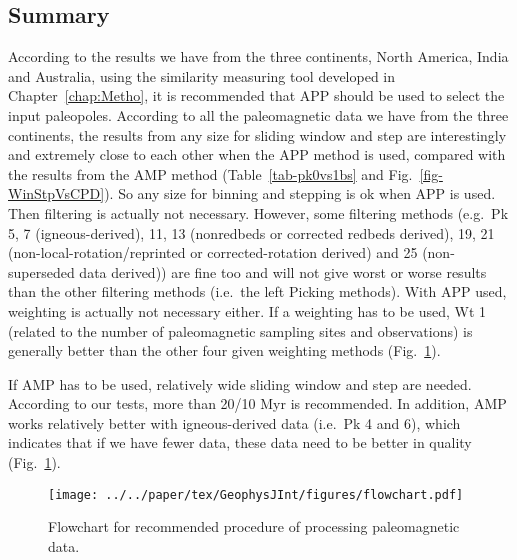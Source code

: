 \subsection{Summary}

According to the results we have from the three continents, North America, India
and Australia, using the similarity measuring tool developed in
Chapter~\ref{chap:Metho}, it is recommended that APP should be used to select
the input paleopoles. According to all the paleomagnetic data we have from the
three continents, the results from any size for sliding window and step are
interestingly and extremely close to each other when the APP method is used,
compared with the results from the AMP method (Table~\ref{tab-pk0vs1bs} and
Fig.~\ref{fig-WinStpVsCPD}). So any size for binning and stepping is ok when APP
is used. Then filtering is actually not necessary. However, some filtering
methods (e.g.\ Pk 5, 7 (igneous-derived), 11, 13 (nonredbeds or corrected
redbeds derived), 19, 21 (non-local-rotation/reprinted or corrected-rotation
derived) and 25 (non-superseded data derived)) are fine too and will not give
worst or worse results than the other filtering methods (i.e.\ the left Picking
methods). With APP used, weighting is actually not necessary either. If a
weighting has to be used, Wt 1 (related to the number of paleomagnetic sampling
sites and observations) is generally better than the other four given weighting
methods (Fig.~\ref{fig-flow}).

If AMP has to be used, relatively wide sliding window and step are needed.
According to our tests, more than 20/10 Myr is recommended. In addition, AMP
works relatively better with igneous-derived data (i.e.\ Pk 4 and 6), which
indicates that if we have fewer data, these data need to be better in quality
(Fig.~\ref{fig-flow}).

\begin{figure}
  \centering
  \texttt{[image: ../../paper/tex/GeophysJInt/figures/flowchart.pdf]}
  \caption[Flowchart of making a reliable paleomagnetic APWP]{Flowchart for
    recommended procedure of processing paleomagnetic data.}\label{fig-flow}
\end{figure}
